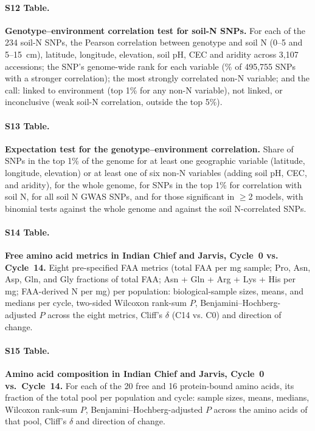\paragraph*{S12 Table.}
\makeatletter
\def\@currentlabelname{S12 Table}
\makeatother
\label{S12_Table}
\textbf{Genotype--environment correlation test for soil-N SNPs.} For each of the 234 soil-N SNPs, the Pearson correlation between genotype and soil N (0--5 and 5--15~cm), latitude, longitude, elevation, soil pH, CEC and aridity across 3,107 accessions; the SNP's genome-wide rank for each variable (\% of 495,755 SNPs with a stronger correlation); the most strongly correlated non-N variable; and the call: linked to environment (top 1\% for any non-N variable), not linked, or inconclusive (weak soil-N correlation, outside the top 5\%).

\paragraph*{S13 Table.}
\makeatletter
\def\@currentlabelname{S13 Table}
\makeatother
\label{S13_Table}
\textbf{Expectation test for the genotype–environment correlation.} Share of SNPs in the top 1\% of the genome for at least one geographic variable (latitude, longitude, elevation) or at least one of six non-N variables (adding soil pH, CEC, and aridity), for the whole genome, for SNPs in the top 1\% for correlation with soil N, for all soil N GWAS SNPs, and for those significant in $\geq$2 models, with binomial tests against the whole genome and against the soil N-correlated SNPs.

\paragraph*{S14 Table.}
\makeatletter
\def\@currentlabelname{S14 Table}
\makeatother
\label{S14_Table}
\textbf{Free amino acid metrics in Indian Chief and Jarvis, Cycle~0 vs. Cycle~14.} Eight pre-specified FAA metrics (total FAA per mg sample; Pro, Asn, Asp, Gln, and Gly fractions of total FAA; Asn + Gln + Arg + Lys + His per mg; FAA-derived N per mg) per population: biological-sample sizes, means, and medians per cycle, two-sided Wilcoxon rank-sum $P$, Benjamini--Hochberg-adjusted $P$ across the eight metrics, Cliff's $\delta$ (C14 vs. C0) and direction of change.

\paragraph*{S15 Table.}
\makeatletter
\def\@currentlabelname{S15 Table}
\makeatother
\label{S15_Table}
\textbf{Amino acid composition in Indian Chief and Jarvis, Cycle~0 vs.\ Cycle~14.} For each of the 20 free and 16 protein-bound amino acids, its fraction of the total pool per population and cycle: sample sizes, means, medians, Wilcoxon rank-sum $P$, Benjamini--Hochberg-adjusted $P$ across the amino acids of that pool, Cliff's $\delta$ and direction of change.

